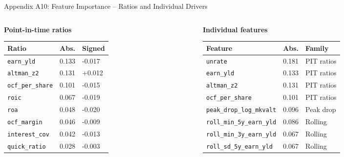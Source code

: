 \documentclass[10pt]{beamer}\usepackage[]{graphicx}\usepackage[table]{xcolor}
\begin{document}
\begin{frame}{Appendix A10: Feature Importance -- Ratios and Individual Drivers}
\scriptsize
\begin{columns}[T,onlytextwidth]
\begin{column}{0.49\textwidth}
\textbf{Point-in-time ratios}
\vspace{0.1em}
\begin{table}[ht]
\centering
\setlength{\tabcolsep}{2.1pt}
\begin{tabular}{L{2.2cm}R{0.85cm}R{0.75cm}}
\toprule
Ratio & Abs. & Signed \\
\midrule
\texttt{earn\_yld} & 0.133 & -0.017 \\
\texttt{altman\_z2} & 0.131 & +0.012 \\
\texttt{ocf\_per\_share} & 0.101 & -0.015 \\
\texttt{roic} & 0.067 & -0.019 \\
\texttt{roa} & 0.048 & -0.020 \\
\texttt{ocf\_margin} & 0.046 & -0.009 \\
\texttt{interest\_cov} & 0.042 & -0.013 \\
\texttt{quick\_ratio} & 0.028 & -0.003 \\
\bottomrule
\end{tabular}
\end{table}
\end{column}
\begin{column}{0.49\textwidth}
\textbf{Individual features}
\vspace{0.1em}
\begin{table}[ht]
\centering
\setlength{\tabcolsep}{1.8pt}
\begin{tabular}{L{2.25cm}R{0.8cm}L{1.45cm}}
\toprule
Feature & Abs. & Family \\
\midrule
\texttt{unrate} & 0.181 & PIT ratios \\
\texttt{earn\_yld} & 0.133 & PIT ratios \\
\texttt{altman\_z2} & 0.131 & PIT ratios \\
\texttt{ocf\_per\_share} & 0.101 & PIT ratios \\
\texttt{peak\_drop\_log\_mkvalt} & 0.096 & Peak drop \\
\texttt{roll\_min\_5y\_earn\_yld} & 0.086 & Rolling \\
\texttt{roll\_min\_3y\_earn\_yld} & 0.067 & Rolling \\
\texttt{roll\_sd\_5y\_earn\_yld} & 0.067 & Rolling \\
\bottomrule
\end{tabular}

\end{table}
\end{column}
\end{columns}
\end{frame}
\end{document}
